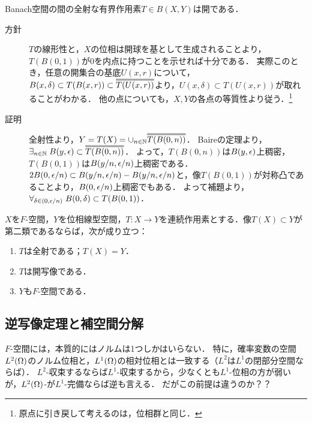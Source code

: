 \documentclass[uplatex,dvipdfmx]{jsreport}
\begin{document}
\begin{theorem}[開写像定理]\label{thm-open-mapping-theorem}
    Banach空間の間の全射な有界作用素$T\in B(X,Y)$は開である．
\end{theorem}
\begin{Proof}\mbox{}
    \begin{description}
        \item[方針] $T$の線形性と，$X$の位相は開球を基として生成されることより，$T(B(0,1))$が$0$を内点に持つことを示せれば十分である．
        実際このとき，任意の開集合の基底$U(x,r)$について，$B(x,\delta)\subset T(B(x,r))\subset\oo{T(U(x,r))}$より，$U(x,\delta)\subset T(U(x,r))$が取れることがわかる．
        他の点についても，$X,Y$の各点の等質性より従う．\footnote{原点に引き戻して考えるのは，位相群と同じ．}
        \item[証明] 全射性より，$Y=T(X)=\cup_{n\in\N}\oo{T(B(0,n))}$．
        Baireの定理より，$\exists_{n\in\N}\;B(y,\ep)\subset\oo{T(B(0,n))}$．
        よって，$T(B(0,n))$は$B(y,\epsilon)$上稠密，
        $T(B(0,1))$は$B(y/n,\epsilon/n)$上稠密である．
        $2B(0,\epsilon/n)\subset B(y/n,\epsilon/n)-B(y/n,\epsilon/n)$と，像$T(B(0,1))$が対称凸であることより，$B(0,\epsilon/n)$上稠密でもある．
        よって補題より，$\forall_{\delta\in(0,\epsilon/n)}\;B(0,\delta)\subset T(B(0,1))$．
    \end{description}
\end{Proof}

\begin{theorem}
    $X$を$F$-空間，$Y$を位相線型空間，$T:X\to Y$を連続作用素とする．像$T(X)\subset Y$が第二類であるならば，次が成り立つ：
    \begin{enumerate}
        \item $T$は全射である；$T(X)=Y$．
        \item $T$は開写像である．
        \item $Y$も$F$-空間である．
    \end{enumerate}
\end{theorem}

\subsection{逆写像定理と補空間分解}

\begin{tcolorbox}[colframe=ForestGreen, colback=ForestGreen!10!white,breakable,colbacktitle=ForestGreen!40!white,coltitle=black,fonttitle=\bfseries\sffamily,
title=]
    $F$-空間には，本質的にはノルムは1つしかはいらない．
    特に，確率変数の空間$L^2(\Omega)$のノルム位相と，$L^1(\Omega)$の相対位相とは一致する（$L^2$は$L^1$の閉部分空間ならば）．
    $L^2$-収束するならば$L^1$-収束するから，少なくとも$L^1$-位相の方が弱いが，$L^2(\Omega)$-が$L^1$-完備ならば逆も言える．
    だがこの前提は違うのか？？
\end{tcolorbox}
\end{document}
